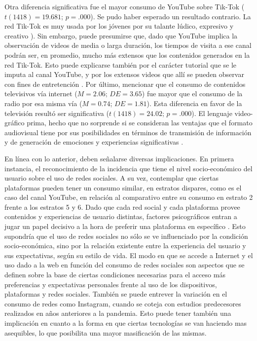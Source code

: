 \documentclass[spanish]{textolivre}
\begin{document}
Otra diferencia significativa fue el mayor consumo de YouTube sobre Tik-Tok ($t(1418) = 19.681$; $p = .000$). Se pudo haber esperado un resultado contrario. La red Tik-Tok es muy usada por los jóvenes por su talante lúdico, expresivo y creativo \cite{shutsko2020}). Sin embargo, puede presumirse que, dado que YouTube implica la observación de videos de media o larga duración, los tiempos de visita a ese canal podrán ser, en promedio, mucho más extensos que los contenidos generados en la red Tik-Tok. Esto puede explicarse también por el carácter tutorial que se le imputa al canal YouTube, y por los extensos videos que allí se pueden observar con fines de entretención \cite{asselin2011}. Por último, mencionar que el consumo de contenidos televisivos vía internet ($M = 2.06$; $DE = 3.65$) fue mayor que el consumo de la radio por esa misma vía ($M = 0.74$; $DE = 1.81$). Esta diferencia en favor de la televisión resultó ser significativa ($t(1418) = 24.02$; $p = .000$). El lenguaje video-gráfico prima, hecho que no sorprende si se consideran las ventajas que el formato audiovisual tiene por sus posibilidades en términos de transmisión de información y de generación de emociones y experiencias significativas \cite{kalliris2014}.

En línea con lo anterior, deben señalarse diversas implicaciones. En primera instancia, el reconocimiento de la incidencia que tiene el nivel socio-económico del usuario sobre el uso de redes sociales. A su vez, contemplar que ciertas plataformas pueden tener un consumo similar, en estratos dispares, como es el caso del canal YouTube, en relación al comparativo entre su consumo en estrato 2 frente a los estratos 5 y 6. Dado que cada red social y cada plataforma provee contenidos y experiencias de usuario distintas, factores psicográficos entran a jugar un papel decisivo a la hora de preferir una plataforma en específico \cite{rodriguez2018}. Esto supondría que el uso de redes sociales no sólo se ve influenciado por la condición socio-económica, sino por la relación existente entre la experiencia del usuario y sus expectativas, según su estilo de vida. El modo en que se accede a Internet y el uso dado a la web en función del consumo de redes sociales son aspectos que se definen sobre la base de ciertas condiciones necesarias para el acceso más preferencias y expectativas personales frente al uso de los dispositivos, plataformas y redes sociales. También se puede entrever la variación en el consumo de redes como Instagram, cuando se coteja con estudios predecesores realizados en años anteriores a la pandemia. Esto puede tener también una implicación en cuanto a la forma en que ciertas tecnologías se van haciendo mas asequibles, lo que posibilita una mayor masificación de las mismas.
\end{document}
